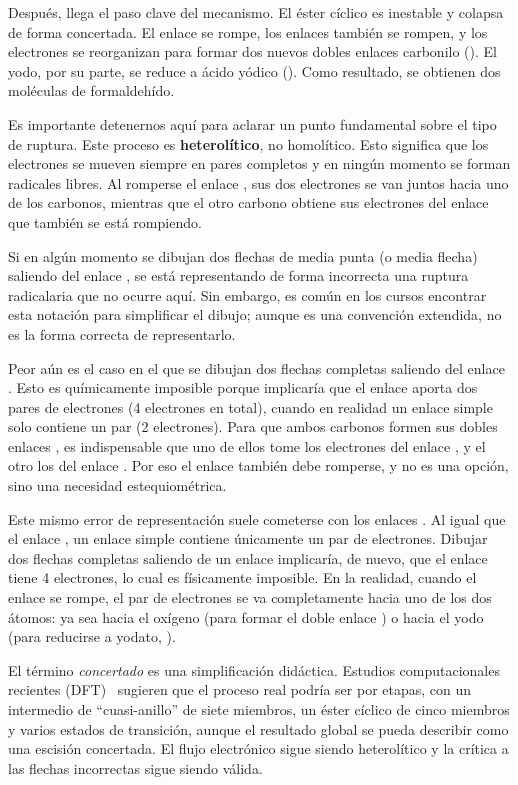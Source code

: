 Después, llega el paso clave del mecanismo. El éster cíclico es inestable y colapsa de 
forma concertada. El enlace  se rompe, los enlaces  también se rompen, 
y los electrones se reorganizan para formar dos nuevos dobles enlaces carbonilo (). 
El yodo, por su parte, se reduce a ácido yódico (). Como resultado, se obtienen 
dos moléculas de formaldehído.

Es importante detenernos aquí para aclarar un punto fundamental sobre el tipo de 
ruptura. Este proceso es \textbf{heterolítico}, no homolítico. Esto significa que 
los electrones se mueven siempre en pares completos y en ningún momento se forman 
radicales libres. Al romperse el enlace , sus dos electrones se van juntos 
hacia uno de los carbonos, mientras que el otro carbono obtiene sus electrones del 
enlace  que también se está rompiendo. 

Si en algún momento se dibujan dos flechas de media punta (o media flecha) saliendo 
del enlace , se está representando de forma incorrecta una ruptura radicalaria 
que no ocurre aquí. Sin embargo, es común en los cursos encontrar esta notación para 
simplificar el dibujo; aunque es una convención extendida, no es la forma correcta 
de representarlo.

Peor aún es el caso en el que se dibujan dos flechas completas saliendo del enlace 
. Esto es químicamente imposible porque implicaría que el enlace  
aporta dos pares de electrones (4 electrones en total), cuando en realidad un enlace 
simple solo contiene un par (2 electrones). Para que ambos carbonos formen sus 
dobles enlaces , es indispensable que uno de ellos tome los electrones del 
enlace , y el otro los del enlace . Por eso el enlace  
también debe romperse, y no es una opción, sino una necesidad estequiométrica.

Este mismo error de representación suele cometerse con los enlaces . Al igual 
que el enlace , un enlace simple  contiene únicamente un par de 
electrones. Dibujar dos flechas completas saliendo de un enlace  implicaría, 
de nuevo, que el enlace tiene 4 electrones, lo cual es físicamente imposible. En la 
realidad, cuando el enlace  se rompe, el par de electrones se va completamente 
hacia uno de los dos átomos: ya sea hacia el oxígeno (para formar el doble enlace 
) o hacia el yodo (para reducirse a yodato, ).

El término \textit{concertado} es una simplificación didáctica. Estudios computacionales 
recientes (DFT)~\supercite{kolodziejczyk2023} sugieren que el proceso real podría ser 
por etapas, con un intermedio de ``cuasi-anillo'' de siete miembros, un éster cíclico 
de cinco miembros y varios estados de transición, aunque el resultado global se pueda 
describir como una escisión concertada. El flujo electrónico sigue siendo heterolítico 
y la crítica a las flechas incorrectas sigue siendo válida.

